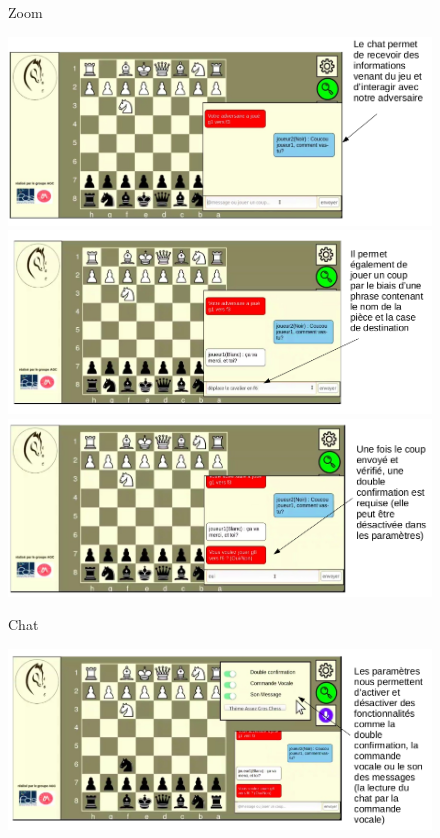 \documentclass[12pt, openany]{report}
\begin{document}
\begin{center}
\begin{figure}
                    \caption{Zoom}
                \end{figure} 
                 \begin{figure}
                   \centering \includegraphics[width=12cm]{UseCase/Jeu1/Game6.png}
                   \includegraphics[width=12cm]{UseCase/Jeu1/Game7.png}
                   \includegraphics[width=12cm]{UseCase/Jeu1/Game8.png}
                    \caption{Chat}
                \end{figure}
                \begin{figure}
                   \centering \includegraphics[width=12cm]{UseCase/Jeu1/Game10.png}

\end{figure}
\end{center}
\end{document}
